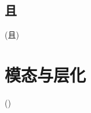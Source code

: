 \subsection{且}

\begin{definition}
	{(且)}
	
\end{definition}

\section{模态与层化}

\begin{definition}
	{()}
\end{definition}















